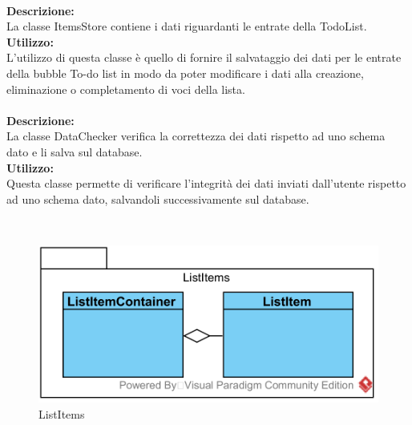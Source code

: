 \label{todo-itemsStore}\mbox{}\\
\textbf{Descrizione:}\\
La classe ItemsStore contiene i dati riguardanti le entrate della TodoList.\\
\textbf{Utilizzo:}\\
L'utilizzo di questa classe è quello di fornire il salvataggio dei dati per le entrate della bubble To-do list in modo da poter modificare i dati alla creazione, eliminazione o completamento di voci della lista.\\

\label{todo-gateway}\mbox{}\\
\textbf{Descrizione:}\\
La classe DataChecker verifica la correttezza dei dati rispetto ad uno schema dato e li salva sul database.\\
\textbf{Utilizzo:}\\
Questa classe permette di verificare l'integrità dei dati inviati dall'utente rispetto ad uno schema dato, salvandoli successivamente sul database.

\mbox{}\\
\begin{figure}[H]
	\centering
	\includegraphics[width=14cm]{../../documenti/SpecificaTecnica/diagrammi_img/classi_e_package/todo_listitems.png}
	\caption{List\-Items}
\end{figure}

